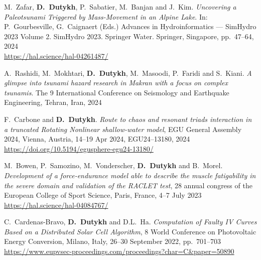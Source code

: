 \begin{etaremune}
  \item M.~Zafar, \textbf{D.~Dutykh}, P.~Sabatier, M.~Banjan and J.~Kim. \textit{Uncovering a Paleotsunami Triggered by Mass-Movement in an Alpine Lake}. In: P.~Gourbesville, G.~Caignaert (Eds.) Advances in Hydroinformatics --- SimHydro 2023 Volume 2. SimHydro 2023. Springer Water. Springer, Singapore, pp.~47--64, 2024 \\ %
  \url{https://hal.science/hal-04261487/}

  \item A.~Rashidi, M.~Mokhtari, \textbf{D.~Dutykh}, M.~Masoodi, P.~Faridi and S.~Kiani. \textit{A glimpse into tsunami hazard research in Makran with a focus on complex tsunamis}. The 9 International Conference on Seismology and Earthquake Engineering, Tehran, Iran, 2024 %

  \item F.~Carbone and \textbf{D.~Dutykh}. \textit{Route to chaos and resonant triads interaction in a truncated Rotating Nonlinear shallow-water model}, EGU General Assembly 2024, Vienna, Austria, 14--19 Apr 2024, EGU24--13180, 2024 \\ %
  \url{https://doi.org/10.5194/egusphere-egu24-13180/}



  \item M.~Bowen, P.~Samozino, M.~Vonderscher, \textbf{D.~Dutykh} and B.~Morel. \textit{Development of a force-endurance model able to describe the muscle fatigability in the severe domain and validation of the RACLET test}, 28 annual congress of the European College of Sport Science, Paris, France, 4--7 July 2023 \\ %
  \url{https://hal.science/hal-04084767/}



  \item C.~Cardenas-Bravo, \textbf{D.~Dutykh} and D.L.~Ha. \textit{Computation of Faulty IV Curves Based on a Distributed Solar Cell Algorithm}, 8 World Conference on Photovoltaic Energy Conversion, Milano, Italy, 26--30 September 2022, pp.~701--703 \\ %
  \url{https://www.eupvsec-proceedings.com/proceedings?char=C&paper=50890}
  

\end{etaremune}
